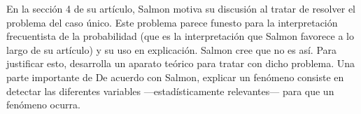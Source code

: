 En la sección 4 de su artículo, Salmon motiva su discusión al tratar
de resolver el problema del caso único. Este problema parece funesto
para la interpretación frecuentista de la probabilidad (que es la
interpretación que Salmon favorece a lo largo de su artículo) y su
uso en explicación. Salmon cree que no es así. Para justificar esto,
desarrolla un aparato teórico para tratar con dicho problema. Una
parte importante de De acuerdo con Salmon, explicar un fenómeno
consiste en detectar las diferentes variables ---estadísticamente
relevantes--- para que un fenómeno ocurra.
